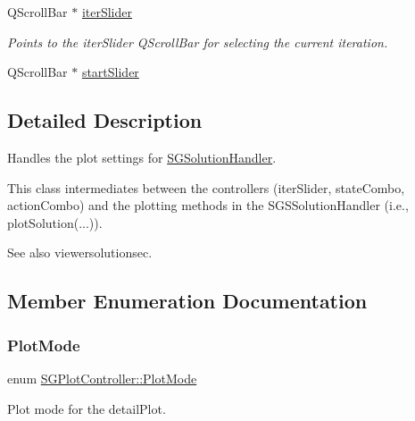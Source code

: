 \begin{DoxyCompactItemize}
\mbox{\label{classSGPlotController_a063783e3acc1d60734baed900e58fb42}} 
Q\+Scroll\+Bar $\ast$ \hyperlink{classSGPlotController_a063783e3acc1d60734baed900e58fb42}{iter\+Slider}
\begin{DoxyCompactList}\small\item\em Points to the iter\+Slider Q\+Scroll\+Bar for selecting the current iteration. \end{DoxyCompactList}\item 
Q\+Scroll\+Bar $\ast$ \hyperlink{classSGPlotController_a399d56ae9da6dac78110e9b70e842ffe}{start\+Slider}
\end{DoxyCompactItemize}


\subsection{Detailed Description}
Handles the plot settings for \hyperlink{classSGSolutionHandler}{S\+G\+Solution\+Handler}. 

This class intermediates between the controllers (iter\+Slider, state\+Combo, action\+Combo) and the plotting methods in the S\+G\+S\+Solution\+Handler (i.\+e., plot\+Solution(...)).

See also viewersolutionsec. 

\subsection{Member Enumeration Documentation}
\mbox{\label{classSGPlotController_a04993344b70e1ac27322f54e43f5bce1}} 
\subsubsection{\texorpdfstring{Plot\+Mode}{PlotMode}}
{\footnotesize\ttfamily enum \hyperlink{classSGPlotController_a04993344b70e1ac27322f54e43f5bce1}{S\+G\+Plot\+Controller\+::\+Plot\+Mode}}



Plot mode for the detail\+Plot. 


